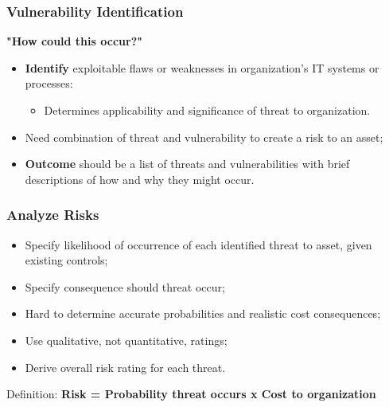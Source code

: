 \documentclass[xcolor ={table,usenames,dvipsnames}]{beamer}
\theoremstyle{definition}
\begin{document}
	\begin{frame}
		\frametitle{Vulnerability Identification}
		 \textbf{"How could this occur?"}
		\begin{itemize}
			\item \textbf{Identify} exploitable flaws or weaknesses in organization’s IT systems or processes:
			\begin{itemize}
				\item Determines applicability and significance of threat to organization.
			\end{itemize}
			\item Need combination of threat and vulnerability to create a risk to an asset;
			\item \textbf{Outcome} should be a list of threats and vulnerabilities with brief descriptions of how and why they might occur.
		\end{itemize}
	\end{frame}
	
	\begin{frame}
		\frametitle{Analyze Risks}
		\begin{itemize}
			\item Specify likelihood of occurrence of each identified threat to asset, given existing controls;
			\item Specify consequence should threat occur;
			\item Hard to determine accurate probabilities and realistic cost consequences;
			\item Use qualitative, not quantitative, ratings; 
			\item Derive overall risk rating for each threat.
		\end{itemize}
		\begin{alertblock}{Definition:}
			\textbf{Risk = Probability threat occurs x Cost to organization}
		\end{alertblock}
	\end{frame}

\end{document}
